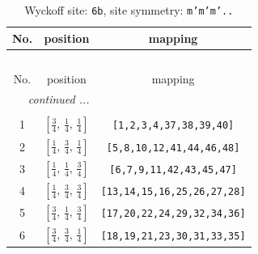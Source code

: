 \documentclass[fleqn,8pt]{jsarticle}
\begin{document}
\begin{longtable}{ccc}
\caption{Wyckoff site: {\tt 6b}, site symmetry: {\tt m'm'm'..}}
 \\
 \hline \hline
No. & position & mapping \\ \hline \endfirsthead

\multicolumn{2}{l}{\tablename\ \thetable{}} \\
 \hline \hline
No. & position & mapping \\ \hline \endhead

 \hline \hline
\multicolumn{2}{r}{\footnotesize\it continued ...} \\ \endfoot

 \hline \hline
\multicolumn{2}{r}{} \\ \endlastfoot

1 & $\left[ \frac{3}{4},\, \frac{1}{4},\, \frac{1}{4} \right]$ & {\tt [1,2,3,4,37,38,39,40]} \\ \hline
2 & $\left[ \frac{1}{4},\, \frac{3}{4},\, \frac{1}{4} \right]$ & {\tt [5,8,10,12,41,44,46,48]} \\ \hline
3 & $\left[ \frac{1}{4},\, \frac{1}{4},\, \frac{3}{4} \right]$ & {\tt [6,7,9,11,42,43,45,47]} \\ \hline
4 & $\left[ \frac{1}{4},\, \frac{3}{4},\, \frac{3}{4} \right]$ & {\tt [13,14,15,16,25,26,27,28]} \\ \hline
5 & $\left[ \frac{3}{4},\, \frac{1}{4},\, \frac{3}{4} \right]$ & {\tt [17,20,22,24,29,32,34,36]} \\ \hline
6 & $\left[ \frac{3}{4},\, \frac{3}{4},\, \frac{1}{4} \right]$ & {\tt [18,19,21,23,30,31,33,35]} \\
\end{longtable}
\renewcommand{\arraystretch}{1.2}
\end{document}
